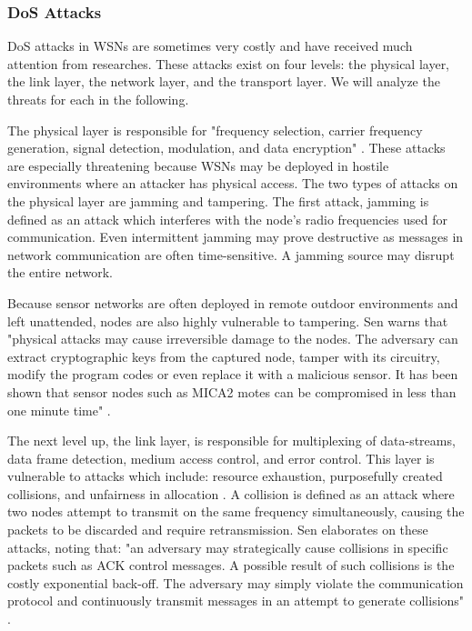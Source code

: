 \documentclass[12pt,a4paper,twoside]{report}
\begin{document}
\subsubsection{DoS Attacks}
DoS attacks in WSNs are sometimes very costly and have received much attention from researches. These attacks exist on four levels: the physical layer, the link layer, the network layer, and the transport layer. We will analyze the threats for each in the following. \par\par
The physical layer is responsible for "frequency selection, carrier frequency generation, signal detection, modulation, and data encryption" \cite{sen:2009}. These attacks are especially threatening because WSNs may be deployed in hostile environments where an attacker has physical access. The two types of attacks on the physical layer are jamming and tampering. The first attack, jamming is defined as an attack which interferes with the node's radio frequencies used for communication. Even intermittent jamming may prove destructive as messages in network communication are often time-sensitive. A jamming source may disrupt the entire network. \par
Because sensor networks are often deployed in remote outdoor environments and left unattended, nodes are also highly vulnerable to tampering. Sen warns that "physical attacks may cause irreversible damage to the nodes. The adversary can extract cryptographic keys from the captured node, tamper with its circuitry, modify the program codes or even replace it with a malicious sensor. It has been shown that sensor nodes such as MICA2 motes can be compromised in less than one minute time" \cite{sen:2009}.  \par\par
The next level up, the link layer, is responsible for multiplexing of data-streams, data frame detection, medium access control, and error control. This layer is vulnerable to attacks which include: resource exhaustion, purposefully created collisions, and unfairness in allocation \cite{sen:2009}. A collision is defined as an attack where two nodes attempt to transmit on the same frequency simultaneously, causing the packets to be discarded and require retransmission. Sen elaborates on these attacks, noting that: "an adversary may strategically cause collisions in specific packets such as ACK control messages. A possible result of such collisions is the costly exponential back-off. The adversary may simply violate the communication protocol and continuously transmit messages in an attempt to generate collisions" \cite{sen:2009}. \par
\end{document}
